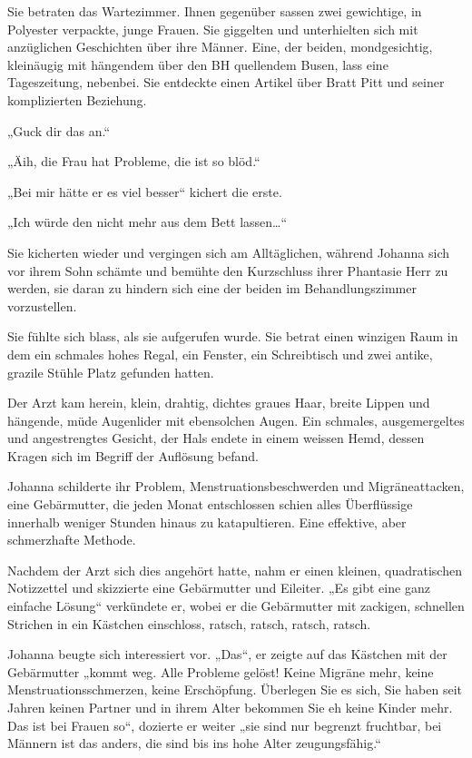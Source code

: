 \documentclass[10pt,titlepage,a5paper]{book}
\begin{document}
Sie betraten das Wartezimmer. Ihnen gegenüber sassen zwei gewichtige, in Polyester verpackte, junge Frauen. Sie giggelten und unterhielten sich mit anzüglichen Geschichten über ihre Männer. Eine, der beiden, mondgesichtig, kleinäugig mit hängendem über den BH quellendem Busen, lass eine Tageszeitung, nebenbei. Sie entdeckte einen Artikel über Bratt Pitt und seiner komplizierten Beziehung. 

„Guck dir das an.“

„Äih, die  Frau hat Probleme, die ist so blöd.“

„Bei mir hätte er es viel besser“ kichert die erste.

„Ich würde den nicht mehr aus dem Bett lassen\dots “

Sie kicherten wieder und vergingen sich am Alltäglichen, während Johanna sich vor ihrem Sohn schämte und bemühte den Kurzschluss ihrer Phantasie Herr zu werden, sie daran zu hindern sich eine der beiden im Behandlungszimmer vorzustellen.

Sie fühlte sich blass, als sie aufgerufen wurde. 
Sie betrat einen winzigen Raum in dem ein schmales hohes Regal, ein Fenster, ein Schreibtisch und zwei antike, grazile Stühle Platz gefunden hatten.

Der Arzt kam herein, klein, drahtig, dichtes graues Haar, breite Lippen und hängende, müde Augenlider mit ebensolchen Augen. Ein schmales, ausgemergeltes und angestrengtes Gesicht, der Hals endete in einem weissen Hemd, dessen Kragen sich im Begriff der Auflösung befand.

Johanna schilderte ihr Problem, Menstruationsbeschwerden und Migräneattacken, eine Gebärmutter, die jeden Monat entschlossen schien alles Überflüssige innerhalb weniger Stunden hinaus zu katapultieren. Eine effektive, aber schmerzhafte Methode.

Nachdem der Arzt sich dies angehört hatte, nahm er einen kleinen, quadratischen Notizzettel und skizzierte eine Gebärmutter und Eileiter. „Es gibt eine ganz einfache Lösung“ verkündete er, wobei er die Gebärmutter mit zackigen, schnellen Strichen in ein Kästchen einschloss, ratsch, ratsch, ratsch, ratsch.

Johanna beugte sich interessiert vor. „Das“, er zeigte auf das Kästchen mit der Gebärmutter „kommt weg. Alle Probleme gelöst! Keine Migräne mehr, keine Menstruationsschmerzen, keine Erschöpfung. Überlegen Sie es sich, Sie haben seit Jahren keinen Partner und in ihrem Alter bekommen Sie eh keine Kinder mehr. Das ist bei Frauen so“, dozierte er weiter „sie sind nur begrenzt fruchtbar, bei Männern ist das anders, die sind bis ins hohe Alter zeugungsfähig.“
\end{document}
